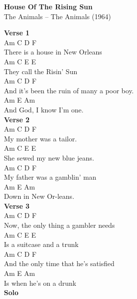 \documentclass[a4paper]{article}
\begin{document}
    \begin{center}
        \textbf{House Of The Rising Sun}
        ~\\
        The Animals -- The Animals (1964)
    \end{center}
    {
        \scriptsize
        \textbf{Verse 1}
        ~\\
        {
            \cutive
            \obeyspaces
      Am   C        D           F
\\
There is a house in New Orleans
\\
     Am       C      E   E
\\
They call the Risin' Sun
\\
         Am       C       D           F
\\
And it's been the ruin of many a poor boy.
\\
    Am     E        Am
\\
And God, I know I'm one.
\\

        }
        \textbf{Verse 2}
        ~\\
        {
            \cutive
            \obeyspaces
   Am     C     D           F
\\
My mother was a tailor.
\\
    Am       C        E     E
\\
She sewed my new blue jeans.
\\
   Am     C     D        F
\\
My father was a gamblin' man
\\
Am      E      Am
\\
Down in New Or-leans.
\\

        }
        \textbf{Verse 3}
        ~\\
        {
            \cutive
            \obeyspaces
         Am   C       D       F
\\
Now, the only thing a gambler needs
\\
     Am       C     E     E
\\
Is a suitcase and a trunk
\\
        Am   C         D          F
\\
And the only time that he's satisfied
\\
   Am        E    Am
\\
Is when he's on a drunk
\\

        }
        \textbf{Solo}
        ~\\
        {
            \cutive
            \obeyspaces

}}
\end{document}
